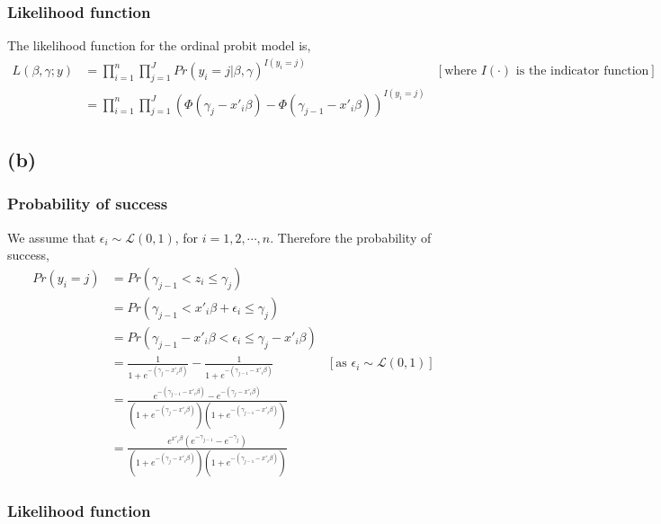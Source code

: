 \documentclass[a4paper]{article}
\begin{document}
\subsubsection*{Likelihood function}

The likelihood function for the ordinal probit model is,
\begin{align*}
    L(\beta,\gamma;y) &= \prod_{i=1}^{n}\prod_{j=1}^{J} Pr(y_i = j | \beta,\gamma)^{I(y_i = j)} &[\text{where } I(\cdot) \text{ is the indicator function}]\\
                      &= \prod_{i=1}^{n}\prod_{j=1}^{J} (\Phi(\gamma_j - x'_{i}\beta) - \Phi(\gamma_{j-1} - x'_{i}\beta))^{I(y_i = j)}
\end{align*}

\subsection*{(b)}

\subsubsection*{Probability of success}

We assume that $\epsilon_i \sim \mathcal{L}(0,1)$, for $i = 1,2, \cdots, n$. Therefore the probability of success,
\begin{align*}
    Pr(y_i = j) &= Pr(\gamma_{j-1} < z_{i} \leq \gamma_j)\\
                &= Pr(\gamma_{j-1} < x'_{i}\beta + \epsilon_{i} \leq \gamma_j) \\
                &= Pr(\gamma_{j-1} - x'_{i}\beta < \epsilon_{i} \leq \gamma_j - x'_{i}\beta) \\
                &= \frac{1}{1+e^{-(\gamma_j - x'_{i}\beta)}} - \frac{1}{1+e^{-(\gamma_{j-1} - x'_{i}\beta)}} & [\text{as } \epsilon_i \sim \mathcal{L}(0,1)] \\
                &= \frac{e^{-(\gamma_{j-1} - x'_{i}\beta)} - e^{-(\gamma_{j} - x'_{i}\beta)}}{(1+e^{-(\gamma_j - x'_{i}\beta)})(1+e^{-(\gamma_{j-1} - x'_{i}\beta)})} \\
                &= \frac{e^{x'_i\beta}(e^{-\gamma_{j-1}} - e^{-\gamma_{j}})}{(1+e^{-(\gamma_j - x'_{i}\beta)})(1+e^{-(\gamma_{j-1} - x'_{i}\beta)})} 
\end{align*}

\subsubsection*{Likelihood function}
\end{document}
